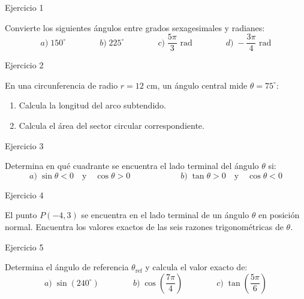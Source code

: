 \documentclass[aspectratio=169]{beamer}
\begin{document}
\begin{frame}{Ejercicio 1}
  \begin{mwejercicio}
    Convierte los siguientes ángulos entre grados sexagesimales y radianes:
    $$a)\; 150^\circ \qquad\qquad b)\; 225^\circ \qquad\qquad c)\; \frac{5\pi}{3}\text{ rad} \qquad\qquad d)\; -\frac{3\pi}{4}\text{ rad}$$
  \end{mwejercicio}
  \vspace{3.5cm}
\end{frame}
\begin{frame}{Ejercicio 2}
  \begin{mwejercicio}
    En una circunferencia de radio $r = 12\text{ cm}$, un ángulo central mide $\theta = 75^\circ$:
    \begin{enumerate}
      \item Calcula la longitud del arco subtendido.
      \item Calcula el área del sector circular correspondiente.
    \end{enumerate}
  \end{mwejercicio}
  \vspace{3.5cm}
\end{frame}
\begin{frame}{Ejercicio 3}
  \begin{mwejercicio}
    Determina en qué cuadrante se encuentra el lado terminal del ángulo $\theta$ si:
    $$a)\; \sin\theta < 0 \quad\text{y}\quad \cos\theta > 0 \qquad\qquad\qquad b)\; \tan\theta > 0 \quad\text{y}\quad \cos\theta < 0$$
  \end{mwejercicio}
  \vspace{3.5cm}
\end{frame}
\begin{frame}{Ejercicio 4}
  \begin{mwejercicio}
    El punto $P(-4, 3)$ se encuentra en el lado terminal de un ángulo $\theta$ en posición normal. Encuentra los valores exactos de las seis razones trigonométricas de $\theta$.
  \end{mwejercicio}
  \vspace{3.5cm}
\end{frame}
\begin{frame}{Ejercicio 5}
  \begin{mwejercicio}
    Determina el ángulo de referencia $\theta_{\text{ref}}$ y calcula el valor exacto de:
    $$a)\; \sin(240^\circ) \qquad\qquad b)\; \cos\left(\frac{7\pi}{4}\right) \qquad\qquad c)\; \tan\left(\frac{5\pi}{6}\right)$$
  \end{mwejercicio}
  \vspace{3.5cm}
\end{frame}
\end{document}
